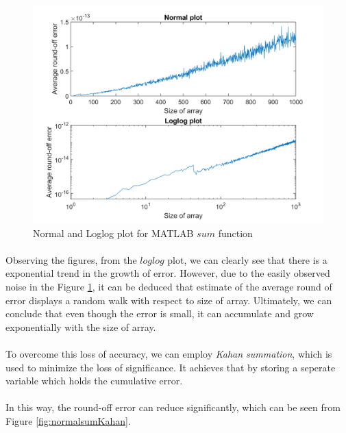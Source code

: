 \documentclass[letterpaper,12pt]{article}
\begin{document}
\begin{figure}[H]
   \centering
   \includegraphics[width=\linewidth]{figures/normalloglogsum.png}
   \caption{Normal and Loglog plot for MATLAB $sum$ function}
   \label{fig:normalloglogsum}  
   \end{figure}

   \paragraph{}Observing the figures, from the $loglog$ plot, we can clearly see that there is a exponential trend in the growth of error. However, due to the easily observed noise in the Figure \ref{fig:normalloglogsum}, it can be deduced that estimate of the average round of error displays a random walk with respect to size of array. Ultimately, we can conclude that even though the error is small, it can accumulate and grow exponentially with the size of array.

   \paragraph{}To overcome this loss of accuracy, we can employ \textit{Kahan summation}, which is used to minimize the loss of significance. It achieves that by storing a seperate variable which holds the cumulative error.
   \pagebreak
   \paragraph{}In this way, the round-off error can reduce significantly, which can be seen from Figure \ref{fig:normalsumKahan}.
\end{document}
